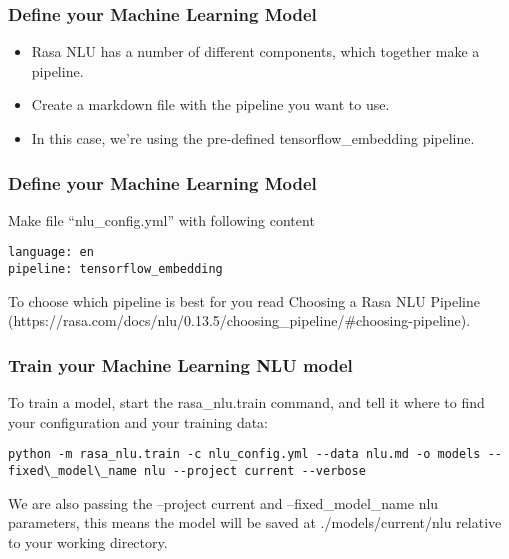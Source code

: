  \begin{frame}[fragile]\frametitle{Define your Machine Learning Model}
 \begin{itemize}
\item Rasa NLU has a number of different components, which together make a pipeline. 
\item Create a markdown file with the pipeline you want to use. 
\item In this case, we're using the pre-defined tensorflow\_embedding pipeline.
\end{itemize}
\end{frame}


 \begin{frame}[fragile]\frametitle{Define your Machine Learning Model}
 Make file ``nlu\_config.yml'' with following content
 \scriptsize
\begin{lstlisting}
language: en
pipeline: tensorflow_embedding
\end{lstlisting}
To choose which pipeline is best for you read Choosing a Rasa NLU Pipeline (https://rasa.com/docs/nlu/0.13.5/choosing\_pipeline/\#choosing-pipeline).
\end{frame}

 \begin{frame}[fragile]\frametitle{Train your Machine Learning NLU model}
To train a model, start the rasa\_nlu.train command, and tell it where to find your configuration and your training data:
\begin{lstlisting}
python -m rasa_nlu.train -c nlu_config.yml --data nlu.md -o models --fixed\_model\_name nlu --project current --verbose
\end{lstlisting}
We are also passing the --project current and --fixed\_model\_name nlu parameters, this means the model will be saved at ./models/current/nlu relative to your working directory.

\end{frame}


